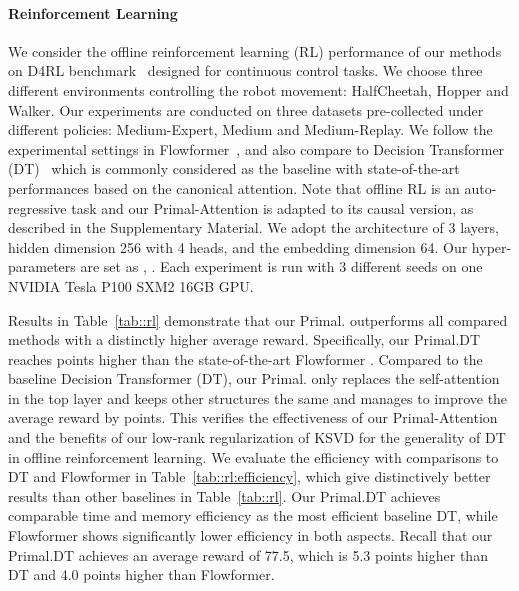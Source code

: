 \documentclass{article}
\begin{document}
\paragraph{Reinforcement Learning}
\label{subsec::reinforcement}
We consider the offline reinforcement learning (RL) performance of our methods on D4RL benchmark~\cite{fu2020d4rl} designed for continuous control tasks.
We choose three different environments controlling the robot movement: HalfCheetah, Hopper and Walker.
Our experiments are conducted on three datasets pre-collected under different policies: Medium-Expert, Medium and Medium-Replay.
We follow the experimental settings in Flowformer~\cite{wu2022flowformer}, and also compare to Decision Transformer (DT)~\cite{chen2021decision} which is commonly considered as the baseline with state-of-the-art performances based on the canonical attention.
Note that offline RL is an auto-regressive task and our Primal-Attention is adapted to its causal version, as described in the Supplementary Material.
We adopt the architecture of 3 layers, hidden dimension 256 with 4 heads, and the embedding dimension 64. 
Our hyper-parameters are set as {, .}
Each experiment is run with 3 different seeds on one NVIDIA Tesla P100 SXM2 16GB GPU. 

Results in Table~\ref{tab::rl} demonstrate that our Primal. outperforms all compared methods with a distinctly higher average reward.
Specifically, our Primal.DT reaches  points higher than the state-of-the-art Flowformer \cite{wu2022flowformer}. 
Compared to the baseline Decision Transformer (DT), our Primal. only replaces the self-attention in the top layer and keeps other structures the same and manages to improve the average reward by  points.
This verifies the effectiveness of our Primal-Attention and the benefits of our low-rank regularization of KSVD for the generality of DT in offline reinforcement learning. 
{We evaluate the efficiency with comparisons to DT and Flowformer in Table~\ref{tab::rl:efficiency}, which give distinctively better results than other baselines in Table~\ref{tab::rl}. 
	Our Primal.DT achieves comparable time and memory efficiency as the most efficient baseline DT, while Flowformer shows significantly lower efficiency in both aspects. Recall that our Primal.DT achieves an average reward of 77.5, which is 5.3 points higher than DT and 4.0 points higher than Flowformer.}
\end{document}
